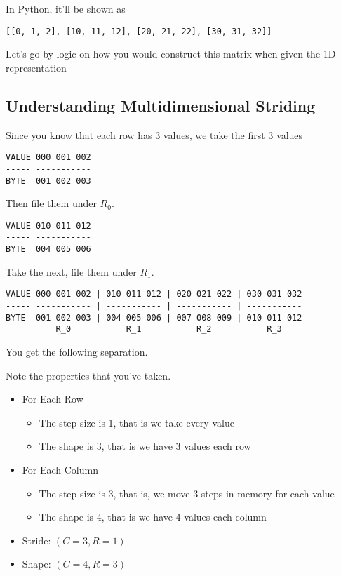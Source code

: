 \documentclass[oneside, 12pt]{report}
\begin{document}
In Python, it'll be shown as

\begin{verbatim}
[[0, 1, 2], [10, 11, 12], [20, 21, 22], [30, 31, 32]]
\end{verbatim}

Let's go by logic on how you would construct this matrix when given the 1D representation

\subsection{Understanding Multidimensional Striding}

Since you know that each row has 3 values, we take the first 3 values

\begin{verbatim}
VALUE 000 001 002
----- -----------
BYTE  001 002 003
\end{verbatim}

Then file them under $R_0$.

\begin{verbatim}
VALUE 010 011 012
----- -----------
BYTE  004 005 006
\end{verbatim}

Take the next, file them under $R_1$.

\begin{verbatim}
VALUE 000 001 002 | 010 011 012 | 020 021 022 | 030 031 032
----- ----------- | ----------- | ----------- | -----------
BYTE  001 002 003 | 004 005 006 | 007 008 009 | 010 011 012
          R_0           R_1           R_2           R_3
\end{verbatim}

You get the following separation. 

Note the properties that you've taken.

\begin{itemize}
\item{For Each Row}
\begin{itemize}
\item{The step size is 1, that is we take every value}
\item{The shape is 3, that is we have 3 values each row}
\end{itemize}

\item{For Each Column}
\begin{itemize}
\item{The step size is 3, that is, we move 3 steps in memory for each value}
\item{The shape is 4, that is we have 4 values each column}
\end{itemize}

\item{Stride: $(C=3, R=1)$}
\item{Shape: $(C=4, R=3)$}
\end{itemize}
\end{document}
